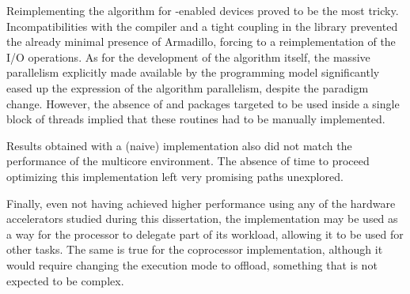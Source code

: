 \documentclass[../thesis]{subfiles}
\begin{document}
	Reimplementing the algorithm for \cuda-enabled devices proved to be the most tricky. Incompatibilities with the compiler and a tight coupling in the library prevented the already minimal presence of Armadillo, forcing to a reimplementation of the I/O operations. As for the development of the algorithm itself, the massive parallelism explicitly made available by the \cuda programming model significantly eased up the expression of the algorithm parallelism, despite the paradigm change. However, the absence of \blas and \lapack packages targeted to be used inside a single block of threads implied that these routines had to be manually implemented.

	Results obtained with a (naive) \cuda implementation also did not match the performance of the multicore environment. The absence of time to proceed optimizing this implementation left very promising paths unexplored.

	Finally, even not having achieved higher performance using any of the hardware accelerators studied during this dissertation, the \cuda implementation may be used as a way for the processor to delegate part of its workload, allowing it to be used for other tasks. The same is true for the coprocessor implementation, although it would require changing the execution mode to offload, something that is not expected to be complex.

	
\end{document}
